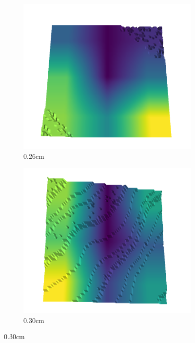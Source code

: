 \documentclass[../document.tex]{subfiles}
\begin{document}
\begin{figure}[H]
\begin{subfigure}[b]{0.192\linewidth}
    \includegraphics[width=\linewidth]{../img/5/quarry/best/25-patch-3d-majavi-colormap-10.png}
    \caption{0.26cm}
    \label{fig : quarry-best-1}
    \end{subfigure}
    \begin{subfigure}[b]{0.192\linewidth}
    \includegraphics[width=\linewidth]{../img/5/quarry/best/30-patch-3d-majavi-colormap-20.png}
    \caption{0.30cm}
    \label{fig : quarry-best-2}
    \end{subfigure}

\end{figure}
\end{document}
